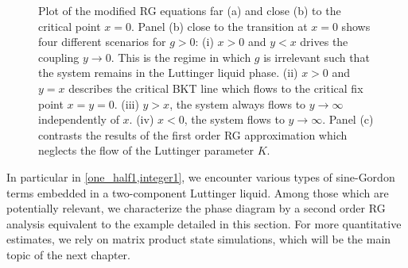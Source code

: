 \begin{figure}
    \caption{Plot of the modified RG equations far (a) and close (b) to the critical point $x=0$. Panel (b) close to the transition at $x=0$ shows four different scenarios for $g>0$: (i) $x>0$ and $y<x$ drives the coupling $y\rightarrow0$. This is the regime in which $g$ is irrelevant such that the system remains in the Luttinger liquid phase. (ii) $x>0$ and $y=x$ describes the critical BKT line which flows to the critical fix point $x=y=0$. (iii) $y>x$, the system always flows to $y\rightarrow\infty$ independently of $x$. (iv) $x<0$, the system flows to $y\rightarrow\infty$. Panel (c) contrasts the results of the first order RG approximation which neglects the flow of the Luttinger parameter $K$.}
    \label{fig:bkt_flow_equations}
\end{figure}

In particular in \cref{one_half1,integer1}, we encounter various types of sine-Gordon terms embedded in a two-component Luttinger liquid.
Among those which are potentially relevant, we characterize the phase diagram by a second order RG analysis equivalent to the example detailed in this section.
For more quantitative estimates, we rely on matrix product state simulations, which will be the main topic of the next chapter.
